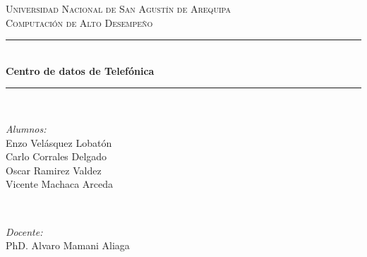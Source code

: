 \documentclass{article}
\newcommand{\csdocente}{Enzo Velásquez Lobatón \\
	Carlo Corrales Delgado\\
	Oscar Ramirez Valdez\\
	Vicente Machaca Arceda}
\newcommand{\cscurso}{Computación de Alto Desempeño}
\newcommand{\csuniversidad}{Universidad Nacional de San Agustín de Arequipa}
\newcommand{\cstema}{Centro de datos de Telefónica}
\begin{document}
	
	
	
	
\begin{titlepage}
	
	\newcommand{\HRule}{\rule{\linewidth}{0.5mm}} %
	
	\center %
	
	
	\textsc{\LARGE \csuniversidad}\\[1.5cm] %
	\textsc{\Large \cscurso}\\[0.5cm] %
	
	
	\vspace{2cm}
	
	\HRule \\[0.4cm]
	{ \huge \bfseries \cstema}\\[0.4cm] %
	\HRule \\[1.5cm]
	
	
	\begin{minipage}{0.4\textwidth}
		\begin{flushleft} \large
			\emph{Alumnos:}\\
			\csdocente
		\end{flushleft}
	\end{minipage}
	~
	\begin{minipage}{0.4\textwidth}
		\begin{flushright} \large
			\emph{Docente:} \\
			PhD. Alvaro Mamani Aliaga
		\end{flushright}
	\end{minipage}\\[2cm]
	

\end{titlepage}
\end{document}

